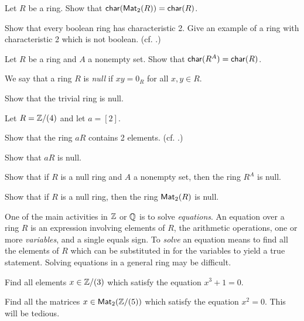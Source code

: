 \begin{exercise}
Let \(R\) be a ring.
Show that \(\mathsf{char}(\mathsf{Mat}_{2}(R)) = \mathsf{char}(R)\).
\end{exercise}

\begin{exercise}
Show that every boolean ring has characteristic 2.
Give an example of a ring with characteristic 2 which is not boolean.
(cf. .)
\end{exercise}

\begin{exercise}
Let \(R\) be a ring and \(A\) a nonempty set.
Show that \(\mathsf{char}(R^A) = \mathsf{char}(R)\).
\end{exercise}

\begin{dfn} \label{dfn:null-ring}
We say that a ring \(R\) is \emph{null}  if \(xy = 0_R\) for all \(x,y \in R\).
\end{dfn}

\begin{exercise}
Show that the trivial ring is null.
\end{exercise}


\begin{exercise}
Let \(R = \mathbb{Z}/(4)\) and let \(a = [2]\).
\begin{proplist*}
\item Show that the ring \(aR\) contains 2 elements.
(cf. .)
\item Show that \(aR\) is null.
\end{proplist*}
\end{exercise}


\begin{exercise}
Show that if \(R\) is a null ring and \(A\) a nonempty set, then the ring \(R^A\) is null.
\end{exercise}


\begin{exercise}
Show that if \(R\) is a null ring, then the ring \(\mathsf{Mat}_{2}(R)\) is null.
\end{exercise}


One of the main activities in \(\mathbb{Z}\) or \(\mathbb{Q}\) is to solve \emph{equations}.
An equation over a ring \(R\) is an expression involving elements of \(R\), the arithmetic operations, one or more \emph{variables}, and a single equals sign.
To \emph{solve} an equation means to find all the elements of \(R\) which can be substituted in for the variables to yield a true statement.
Solving equations in a general ring may be difficult. \medskip


\begin{exercise}
Find all elements \(x \in \mathbb{Z}/(3)\) which satisfy the equation \(x^3 + 1 = 0\).
\end{exercise}


\begin{exercise}
Find all the matrices \(x \in \mathsf{Mat}_{2}(\mathbb{Z}/(5))\) which satisfy the equation \(x^2 = 0\).
This will be tedious.
\end{exercise}
